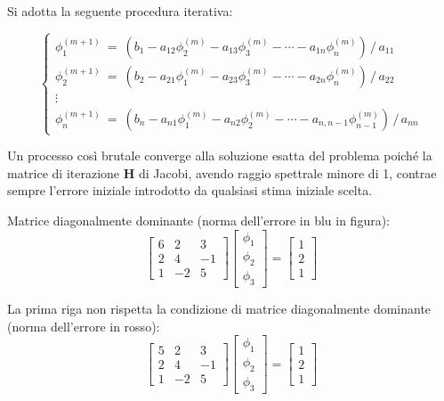 Si adotta la seguente procedura iterativa:

\begin{equation*}
	\begin{cases}
		\phi_1^{(m+1)}\ =\ \left(b_1 - a_{12} \phi_2^{(m)} - a_{13} \phi_3^{(m)} - \cdots - a_{1n} \phi_n^{(m)}\right)\, /\, a_{11} \\
		
		\phi_2^{(m+1)}\ =\ \left(b_2 - a_{21} \phi_1^{(m)} - a_{23} \phi_3^{(m)} - \cdots - a_{2n} \phi_n^{(m)}\right) \, /\, a_{22} \\
		\vdots \\
		
		\phi_n^{(m+1)}\ =\ \left(b_n - a_{n1} \phi_1^{(m)} - a_{n2} \phi_2^{(m)} - \cdots - a_{n,n-1} \phi_{n-1}^{(m)}\right)\, /\, a_{nn}
	\end{cases}
	\label{eq:iterazione_jacobi}
\end{equation*}

Un processo così brutale converge alla soluzione esatta del problema poiché la matrice di iterazione \(\mathbf{H}\) di Jacobi, avendo raggio spettrale minore di 1, contrae sempre l'errore iniziale introdotto da qualsiasi stima iniziale scelta.

Matrice diagonalmente dominante (norma dell'errore in blu in figura):
\[
\begin{bmatrix}
	6 & 2 & 3 \\
	2 & 4 & -1 \\
	1 & -2 & 5
\end{bmatrix}
\begin{bmatrix}
	\phi_1 \\ \phi_2 \\ \phi_3
\end{bmatrix}
=
\begin{bmatrix}
	1 \\ 2 \\ 1
\end{bmatrix}
\]

La prima riga non rispetta la condizione di matrice diagonalmente dominante (norma dell'errore in rosso):
\[
\begin{bmatrix}
	5 & 2 & 3 \\
	2 & 4 & -1 \\
	1 & -2 & 5
\end{bmatrix}
\begin{bmatrix}
	\phi_1 \\ \phi_2 \\ \phi_3
\end{bmatrix}
=
\begin{bmatrix}
	1 \\ 2 \\ 1
\end{bmatrix}
\]

